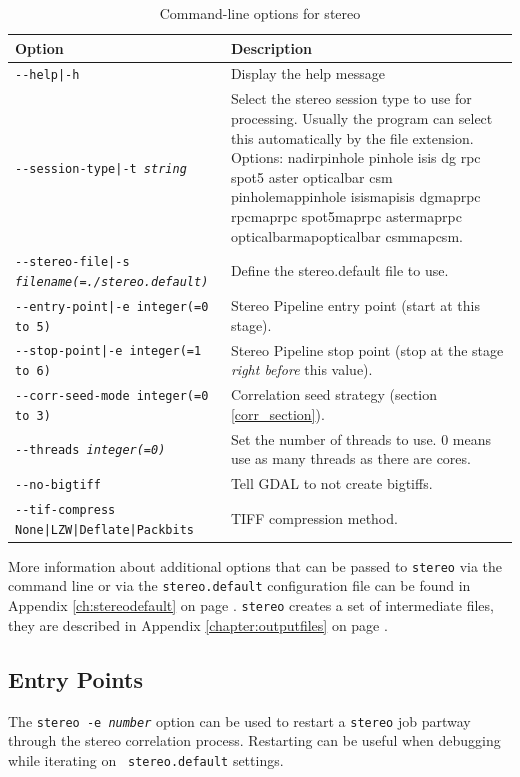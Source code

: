 \begin{longtable}{|l|p{7.5cm}|}
\caption{Command-line options for stereo}
\label{tbl:stereo}
\endfirsthead
\endhead
\endfoot
\endlastfoot
\hline
Option & Description \\ \hline \hline
\texttt{-\/-help|-h} & Display the help message\\ \hline
\texttt{-\/-session-type|-t \textit{string} } & Select the stereo session type to use for processing. Usually the program can select this automatically by the file extension. Options: nadirpinhole pinhole isis dg rpc spot5 aster opticalbar csm pinholemappinhole isismapisis dgmaprpc rpcmaprpc spot5maprpc astermaprpc opticalbarmapopticalbar csmmapcsm. \\ \hline
\texttt{-\/-stereo-file|-s \textit{filename(=./stereo.default)}} & Define the stereo.default file to use.\\ \hline
\texttt{-\/-entry-point|-e integer(=0 to 5)} & Stereo Pipeline entry
point (start at this stage). \\ \hline
\texttt{-\/-stop-point|-e integer(=1 to 6)} & Stereo Pipeline stop point (stop at the stage {\it right before} this value). \\ \hline
\texttt{-\/-corr-seed-mode integer(=0 to 3)} & Correlation seed strategy (section \ref{corr_section}). \\ \hline
\texttt{-\/-threads \textit{integer(=0)}} & Set the number of threads to use. 0 means use as many threads as there are cores.\\ \hline
\texttt{-\/-no-bigtiff} & Tell GDAL to not create bigtiffs.\\ \hline
\texttt{-\/-tif-compress None|LZW|Deflate|Packbits} & TIFF compression method.\\ \hline
\end{longtable}

More information about additional options that can be passed to \texttt{stereo}
via the command line or via the \texttt{stereo.default} configuration file can be
found in Appendix \ref{ch:stereodefault} on page
\pageref{ch:stereodefault}.  \texttt{stereo} creates a set
of intermediate files, they are described in Appendix
\ref{chapter:outputfiles} on page \pageref{chapter:outputfiles}.

\subsection{Entry Points}
\label{entrypoints}

The \texttt{stereo -e \textit{number}} option can be used to restart
a {\tt stereo} job partway through the stereo correlation process.
Restarting can be useful when debugging while iterating on {\tt
stereo.default} settings.

